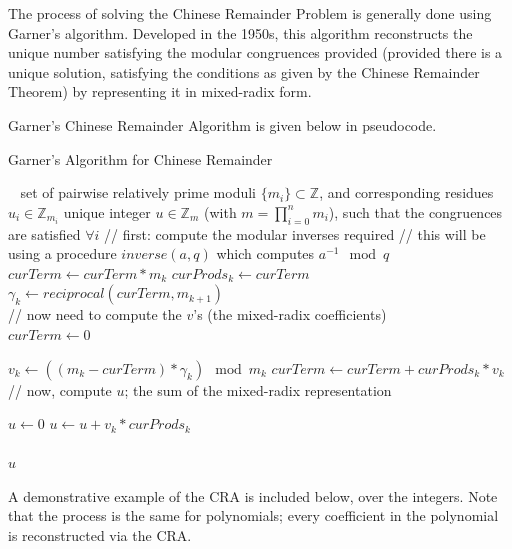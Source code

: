 \documentclass[letterpaper,12pt,titlepage,oneside,final]{book}
\begin{document}
The process of solving the Chinese Remainder Problem is generally done using Garner's algorithm.  Developed in the 1950s, this algorithm reconstructs the unique number satisfying the modular congruences provided (provided there is a unique solution, satisfying the conditions as given by the Chinese Remainder Theorem) by representing it in mixed-radix form.  

Garner's Chinese Remainder Algorithm is given below in pseudocode.

\begin{algorithm}[H]
\caption{Garner's Algorithm for Chinese Remainder}\label{CRA}
\begin{algorithmic}[1]
\Input $\; \; $ set of pairwise relatively prime moduli ${\{m_i\} \subset \mathbb{Z}}$, and corresponding residues ${u_i \in \mathbb{Z}_{m_i}}$
\Output unique integer ${u \in \mathbb{Z}_m}$ (with ${m = \prod_{i=0}^{n}m_i}$), such that the congruences are satisfied ${\forall i}$  
\State // first: compute the modular inverses required
\State // this will be using a procedure $inverse( a, q)$ which computes ${a^{-1} \mod q}$
  \State $curTerm \gets curTerm * m_k$
  \State $curProds_k \gets curTerm$\\
  \State $\gamma_k \gets reciprocal( curTerm, m_{k+1})$
\EndFor\\

\State // now need to compute the $v$'s (the mixed-radix coefficients)\\
\State $curTerm \gets 0$

  \State $v_k \gets ((m_k - curTerm) * \gamma_k) \mod m_k$
  \State $curTerm \gets curTerm + curProds_k * v_k$
\EndFor\\

\State // now, compute $u$; the sum of the mixed-radix representation

\State $u \gets 0$
  \State $u \gets u + v_k * curProds_k$
\EndFor\\\\

\Return $u$
\EndProcedure
\end{algorithmic}
\end{algorithm} 

A demonstrative example of the CRA is included below, over the integers.  Note that the process is the same for polynomials; every coefficient in the polynomial is reconstructed via the CRA.
\end{document}
